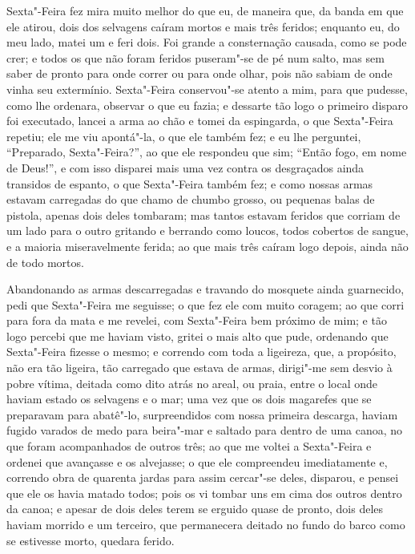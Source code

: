 Sexta"-Feira fez mira muito melhor do que eu, de maneira que, da banda em
que ele atirou, dois dos selvagens caíram mortos e mais três feridos;
enquanto eu, do meu lado, matei um e feri dois. Foi grande a
consternação causada, como se pode crer; e todos os que não foram
feridos puseram"-se de pé num salto, mas sem saber de pronto para onde
correr ou para onde olhar, pois não sabiam de onde vinha seu extermínio.
Sexta"-Feira conservou"-se atento a mim, para que pudesse, como lhe
ordenara, observar o que eu fazia; e dessarte tão logo o primeiro
disparo foi executado, lancei a arma ao chão e tomei da espingarda, o
que Sexta"-Feira repetiu; ele me viu apontá"-la, o que ele também fez; e
eu lhe perguntei, ``Preparado, Sexta"-Feira?'', ao que ele respondeu que
sim; ``Então fogo, em nome de Deus!'', e com isso disparei mais uma vez
contra os desgraçados ainda transidos de espanto, o que Sexta"-Feira
também fez; e como nossas armas estavam carregadas do que chamo de
chumbo grosso, ou pequenas balas de pistola, apenas dois deles tombaram;
mas tantos estavam feridos que corriam de um lado para o outro gritando
e berrando como loucos, todos cobertos de sangue, e a maioria
miseravelmente ferida; ao que mais três caíram logo depois, ainda não de
todo mortos.

Abandonando as armas descarregadas e travando do mosquete ainda
guarnecido, pedi que Sexta"-Feira me seguisse; o que fez ele com muito
coragem; ao que corri para fora da mata e me revelei, com Sexta"-Feira
bem próximo de mim; e tão logo percebi que me haviam visto, gritei o
mais alto que pude, ordenando que Sexta"-Feira fizesse o mesmo; e
correndo com toda a ligeireza, que, a propósito, não era tão ligeira,
tão carregado que estava de armas, dirigi"-me sem desvio à pobre vítima,
deitada como dito atrás no areal, ou praia, entre o local onde haviam
estado os selvagens e o mar; uma vez que os dois magarefes que se
preparavam para abatê"-lo, surpreendidos com nossa primeira descarga,
haviam fugido varados de medo para beira"-mar e saltado para dentro de
uma canoa, no que foram acompanhados de outros três; ao que me voltei a
Sexta"-Feira e ordenei que avançasse e os alvejasse; o que ele
compreendeu imediatamente e, correndo obra de quarenta jardas para assim
cercar"-se deles, disparou, e pensei que ele os havia matado todos; pois
os vi tombar uns em cima dos outros dentro da canoa; e apesar de dois
deles terem se erguido quase de pronto, dois deles haviam morrido e um
terceiro, que permanecera deitado no fundo do barco como se estivesse
morto, quedara ferido.

